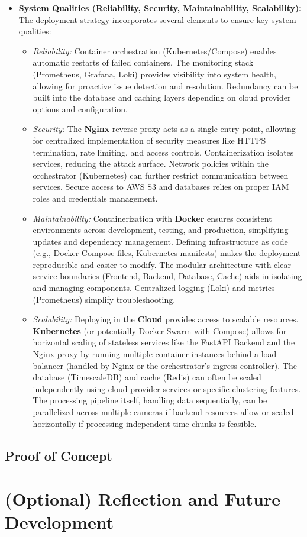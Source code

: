 \begin{itemize}
    \item \textbf{System Qualities (Reliability, Security, Maintainability, Scalability):}
        The deployment strategy incorporates several elements to ensure key system qualities:
        \begin{itemize}
            \item \textit{Reliability:} Container orchestration (Kubernetes/Compose) enables automatic restarts of failed containers. The monitoring stack (Prometheus, Grafana, Loki) provides visibility into system health, allowing for proactive issue detection and resolution. Redundancy can be built into the database and caching layers depending on cloud provider options and configuration.
            \item \textit{Security:} The \textbf{Nginx} reverse proxy acts as a single entry point, allowing for centralized implementation of security measures like HTTPS termination, rate limiting, and access controls. Containerization isolates services, reducing the attack surface. Network policies within the orchestrator (Kubernetes) can further restrict communication between services. Secure access to AWS S3 and databases relies on proper IAM roles and credentials management.
            \item \textit{Maintainability:} Containerization with \textbf{Docker} ensures consistent environments across development, testing, and production, simplifying updates and dependency management. Defining infrastructure as code (e.g., Docker Compose files, Kubernetes manifests) makes the deployment reproducible and easier to modify. The modular architecture with clear service boundaries (Frontend, Backend, Database, Cache) aids in isolating and managing components. Centralized logging (Loki) and metrics (Prometheus) simplify troubleshooting.
            \item \textit{Scalability:} Deploying in the \textbf{Cloud} provides access to scalable resources. \textbf{Kubernetes} (or potentially Docker Swarm with Compose) allows for horizontal scaling of stateless services like the FastAPI Backend and the Nginx proxy by running multiple container instances behind a load balancer (handled by Nginx or the orchestrator's ingress controller). The database (TimescaleDB) and cache (Redis) can often be scaled independently using cloud provider services or specific clustering features. The processing pipeline itself, handling data sequentially, can be parallelized across multiple cameras if backend resources allow or scaled horizontally if processing independent time chunks is feasible.
        \end{itemize}
\end{itemize}

\subsection{Proof of Concept}

\section{(Optional) Reflection and Future Development}
\label{section:ai-reflection}
